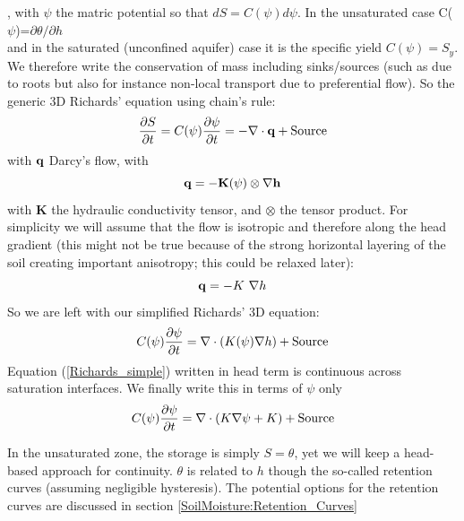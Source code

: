 \documentclass{article}
\begin{document}
, with $\psi$ the matric potential so that $dS = C(\psi)d\psi$. In the unsaturated case C($\psi$)=$\partial \theta /\partial h$ \\ and in the saturated (unconfined aquifer) case it is the specific yield $C(\psi)=S_y$.
We therefore write the conservation of mass including sinks/sources (such as due to roots but also for instance non-local transport due to preferential flow). 
So the generic 3D Richards' equation using chain's rule:
\begin{equation}
     \frac{\partial S}{\partial t} = C(\psi)\frac{\partial \psi}{\partial t} = -\nabla \cdot {\bf{q}} + {\rm Source}
\label{Richards}
\end{equation}
with $\bf{q}$ Darcy's flow, with 
\begin{equation}
     \bf{q} = - \mathbf{K}(\psi) \otimes \nabla h
\end{equation} with $ \mathbf{K}$ the hydraulic conductivity tensor, and $\otimes$ the tensor product.
For simplicity we will assume that the flow is isotropic and therefore along the head gradient (this might not be true because of the strong horizontal layering of the soil creating important anisotropy; this could be relaxed later):
\begin{equation}
     {\bf{q}} = - K \ \nabla h
\end{equation}
So we are left with our simplified Richards' 3D equation:
\begin{equation}
     C(\psi)\frac{\partial \psi}{\partial t}  = \nabla \cdot \left( {K(\psi) \nabla h} \right) + {\rm Source}
\label{Richards_simple}
\end{equation}
Equation (\ref{Richards_simple}) written in head term is continuous across saturation interfaces.
We finally write this in terms of $\psi$ only
\begin{equation}
     C(\psi)\frac{\partial \psi}{\partial t}  = \nabla \cdot \left( {K \nabla \psi} + K \right) + {\rm Source}
\label{Richards_simple}
\end{equation}


In the unsaturated zone, the storage is simply $S=\theta$, yet we will keep a head-based approach for continuity. $\theta$ is related to $h$ though the so-called retention curves (assuming negligible hysteresis). The potential options for the retention curves are discussed in section \ref{SoilMoisture:Retention_Curves}
\end{document}

